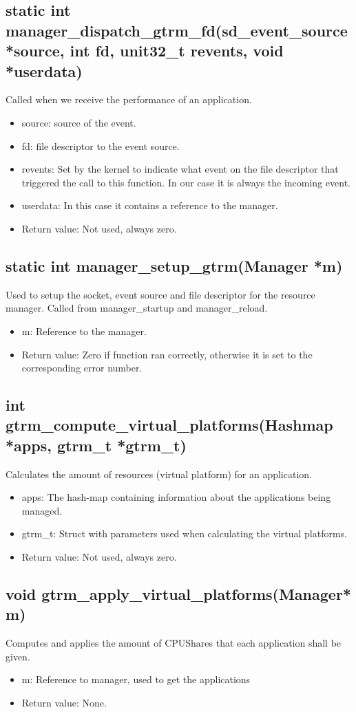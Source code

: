 \documentclass[nobiblatex]{LTHthesis}
\begin{document}
\subsection{static int manager\_dispatch\_gtrm\_fd(sd\_event\_source *source, int fd, unit32\_t revents, void *userdata)}
Called when we receive the performance of an application.
\begin{itemize}
\item source: source of the event.
\item fd: file descriptor to the event source.
\item revents: Set by the kernel to indicate what event on the file descriptor that triggered the call to this function. In our case it is always the incoming event.
\item userdata: In this case it contains a reference to the manager.
\item Return value: Not used, always zero.
\end{itemize}

\subsection{static int manager\_setup\_gtrm(Manager *m)}
Used to setup the socket, event source and file descriptor for the resource manager. Called from manager\_startup and manager\_reload.
\begin{itemize}
\item m: Reference to the manager.
\item Return value: Zero if function ran correctly, otherwise it is set to the corresponding error number.
\end{itemize}

\subsection{int gtrm\_compute\_virtual\_platforms(Hashmap *apps, gtrm\_t *gtrm\_t)}
Calculates the amount of resources (virtual platform) for an application.
\begin{itemize}
\item apps: The hash-map containing information about the applications being managed.
\item gtrm\_t: Struct with parameters used when calculating the virtual platforms.
\item Return value: Not used, always zero.
\end{itemize}

\subsection{void gtrm\_apply\_virtual\_platforms(Manager* m)}
Computes and applies the amount of CPUShares that each application shall be given.
\begin{itemize}
\item m: Reference to manager, used to get the applications
\item Return value: None.
\end{itemize}
\end{document}
